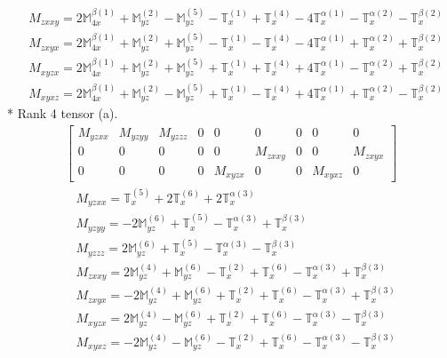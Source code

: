 \documentclass[fleqn,8pt,landscape]{jsarticle}
\begin{document}
\begin{align*}
& M_{zxxy} = 2 \mathbb{M}_{4x}^{\beta(1)} + \mathbb{M}_{yz}^{(2)} - \mathbb{M}_{yz}^{(5)} - \mathbb{T}_{x}^{(1)} + \mathbb{T}_{x}^{(4)} - 4 \mathbb{T}_{x}^{\alpha(1)} - \mathbb{T}_{x}^{\alpha(2)} - \mathbb{T}_{x}^{\beta(2)} \\
& M_{zxyx} = 2 \mathbb{M}_{4x}^{\beta(1)} + \mathbb{M}_{yz}^{(2)} + \mathbb{M}_{yz}^{(5)} - \mathbb{T}_{x}^{(1)} - \mathbb{T}_{x}^{(4)} - 4 \mathbb{T}_{x}^{\alpha(1)} + \mathbb{T}_{x}^{\alpha(2)} + \mathbb{T}_{x}^{\beta(2)} \\
& M_{xyzx} = 2 \mathbb{M}_{4x}^{\beta(1)} + \mathbb{M}_{yz}^{(2)} + \mathbb{M}_{yz}^{(5)} + \mathbb{T}_{x}^{(1)} + \mathbb{T}_{x}^{(4)} + 4 \mathbb{T}_{x}^{\alpha(1)} - \mathbb{T}_{x}^{\alpha(2)} + \mathbb{T}_{x}^{\beta(2)} \\
& M_{xyxz} = 2 \mathbb{M}_{4x}^{\beta(1)} + \mathbb{M}_{yz}^{(2)} - \mathbb{M}_{yz}^{(5)} + \mathbb{T}_{x}^{(1)} - \mathbb{T}_{x}^{(4)} + 4 \mathbb{T}_{x}^{\alpha(1)} + \mathbb{T}_{x}^{\alpha(2)} - \mathbb{T}_{x}^{\beta(2)}
\end{align*}
* Rank 4 tensor (a).
\begin{align*}
\begin{bmatrix} M_{yzxx} & M_{yzyy} & M_{yzzz} & 0 & 0 & 0 & 0 & 0 & 0 \\ 0 & 0 & 0 & 0 & 0 & M_{zxxy} & 0 & 0 & M_{zxyx} \\ 0 & 0 & 0 & 0 & M_{xyzx} & 0 & 0 & M_{xyxz} & 0 \end{bmatrix}
\end{align*}
\begin{align*}
& M_{yzxx} = \mathbb{T}_{x}^{(5)} + 2 \mathbb{T}_{x}^{(6)} + 2 \mathbb{T}_{x}^{\alpha(3)} \\
& M_{yzyy} = - 2 \mathbb{M}_{yz}^{(6)} + \mathbb{T}_{x}^{(5)} - \mathbb{T}_{x}^{\alpha(3)} + \mathbb{T}_{x}^{\beta(3)} \\
& M_{yzzz} = 2 \mathbb{M}_{yz}^{(6)} + \mathbb{T}_{x}^{(5)} - \mathbb{T}_{x}^{\alpha(3)} - \mathbb{T}_{x}^{\beta(3)} \\
& M_{zxxy} = 2 \mathbb{M}_{yz}^{(4)} + \mathbb{M}_{yz}^{(6)} - \mathbb{T}_{x}^{(2)} + \mathbb{T}_{x}^{(6)} - \mathbb{T}_{x}^{\alpha(3)} + \mathbb{T}_{x}^{\beta(3)} \\
& M_{zxyx} = - 2 \mathbb{M}_{yz}^{(4)} + \mathbb{M}_{yz}^{(6)} + \mathbb{T}_{x}^{(2)} + \mathbb{T}_{x}^{(6)} - \mathbb{T}_{x}^{\alpha(3)} + \mathbb{T}_{x}^{\beta(3)} \\
& M_{xyzx} = 2 \mathbb{M}_{yz}^{(4)} - \mathbb{M}_{yz}^{(6)} + \mathbb{T}_{x}^{(2)} + \mathbb{T}_{x}^{(6)} - \mathbb{T}_{x}^{\alpha(3)} - \mathbb{T}_{x}^{\beta(3)} \\
& M_{xyxz} = - 2 \mathbb{M}_{yz}^{(4)} - \mathbb{M}_{yz}^{(6)} - \mathbb{T}_{x}^{(2)} + \mathbb{T}_{x}^{(6)} - \mathbb{T}_{x}^{\alpha(3)} - \mathbb{T}_{x}^{\beta(3)}
\end{align*}
\end{document}
